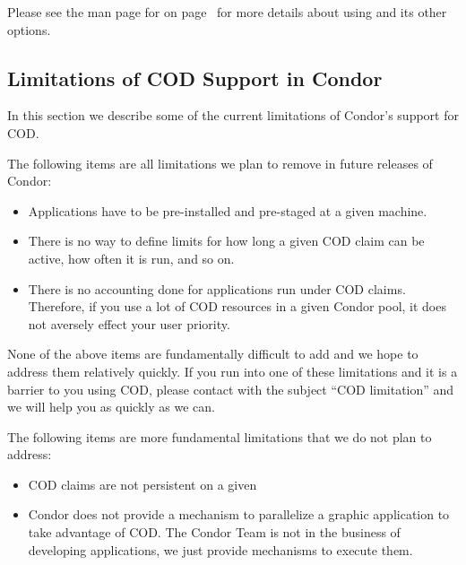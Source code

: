 %
%

Please see the man page for  on
page~\pageref{man-condor-status} for more details about using
 and its other options.


\subsection{\label{sec:cod-limitations}
Limitations of COD Support in Condor}

In this section we describe some of the current limitations of
Condor's support for COD.

The following items are all limitations we plan to remove in future
releases of Condor:

%
%

\begin{itemize}

\item Applications have to be pre-installed and pre-staged at a given
  machine. 

\item There is no way to define limits for how long a given COD claim
  can be active, how often it is run, and so on.

\item There is no accounting done for applications run under COD
  claims.
  Therefore, if you use a lot of COD resources in a given Condor pool,
  it does not aversely effect your user priority.

\end{itemize}

None of the above items are fundamentally difficult to add and we hope
to address them relatively quickly.
If you run into one of these limitations and it is a barrier to you
using COD, please contact  with the
subject ``COD limitation'' and we will help you as quickly as we can.

The following items are more fundamental limitations that we do not
plan to address:

\begin{itemize}

\item COD claims are not persistent on a given 

\item Condor does not provide a mechanism to parallelize a graphic
  application to take advantage of COD.  
  The Condor Team is not in the business of developing applications,
  we just provide mechanisms to execute them.

\end{itemize}
